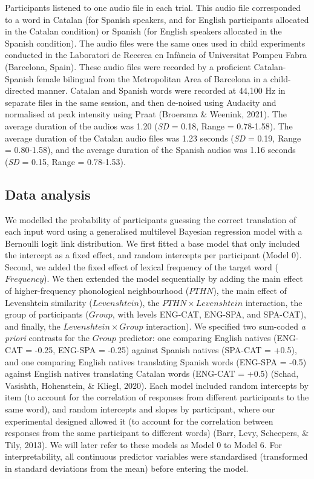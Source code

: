 \documentclass[
  english,
  man,floatsintext]{apa6}
\begin{document}
Participants listened to one audio file in each trial. This audio file corresponded to a word in Catalan (for Spanish speakers, and for English participants allocated in the Catalan condition) or Spanish (for English speakers allocated in the Spanish condition). The audio files were the same ones used in child experiments conducted in the Laboratori de Recerca en Infància of Universitat Pompeu Fabra (Barcelona, Spain). These audio files were recorded by a proficient Catalan-Spanish female bilingual from the Metropolitan Area of Barcelona in a child-directed manner. Catalan and Spanish words were recorded at 44,100 Hz in separate files in the same session, and then de-noised using Audacity and normalised at peak intensity using Praat (Broersma \& Weenink, 2021). The average duration of the audios was 1.20 (\emph{SD} = 0.18, Range = 0.78-1.58). The average duration of the Catalan audio files was 1.23 seconds (\emph{SD} = 0.19, Range = 0.80-1.58), and the average duration of the Spanish audios was 1.16 seconds (\emph{SD} = 0.15, Range = 0.78-1.53).

\hypertarget{data-analysis}{%
\subsection{Data analysis}\label{data-analysis}}

We modelled the probability of participants guessing the correct translation of each input word using a generalised multilevel Bayesian regression model with a Bernoulli logit link distribution. We first fitted a base model that only included the intercept as a fixed effect, and random intercepts per participant (Model 0). Second, we added the fixed effect of lexical frequency of the target word (\(Frequency\)). We then extended the model sequentially by adding the main effect of higher-frequency phonological neighbourhood (\(PTHN\)), the main effect of Levenshtein similarity (\(Levenshtein\)), the \(PTHN \times Levenshtein\) interaction, the group of participants (\(Group\), with levels ENG-CAT, ENG-SPA, and SPA-CAT), and finally, the \(Levenshtein \times Group\) interaction). We specified two sum-coded \emph{a priori} contrasts for the \(Group\) predictor: one comparing English natives (ENG-CAT = -0.25, ENG-SPA = -0.25) against Spanish natives (SPA-CAT = +0.5), and one comparing English natives translating Spanish words (ENG-SPA = -0.5) against English natives translating Catalan words (ENG-CAT = +0.5) (Schad, Vasishth, Hohenstein, \& Kliegl, 2020). Each model included random intercepts by item (to account for the correlation of responses from different participants to the same word), and random intercepts and slopes by participant, where our experimental designed allowed it (to account for the correlation between responses from the same participant to different words) (Barr, Levy, Scheepers, \& Tily, 2013). We will later refer to these models as Model 0 to Model 6. For interpretability, all continuous predictor variables were standardised (transformed in standard deviations from the mean) before entering the model.
\end{document}
